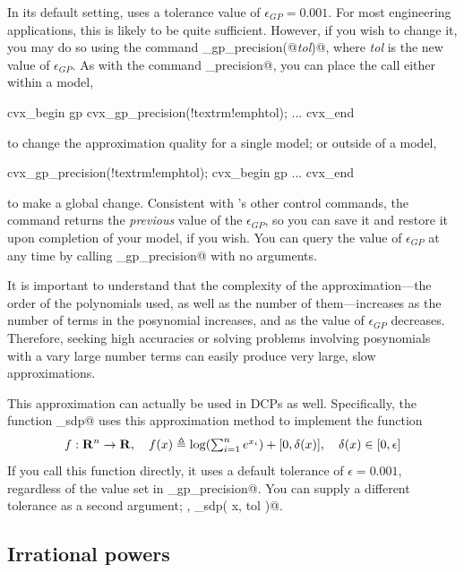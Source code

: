 \documentclass[12pt]{article}
\begin{document}
In its default setting, \cvx uses a tolerance value of $\epsilon_{GP}=0.001$.
For most engineering applications, this is likely to be quite sufficient. However,
if you wish to change it, you may do so using the command
\verb@cvx_gp_precision(@\emph{tol}\verb@)@,
where \emph{tol} is the new value of $\epsilon_{GP}$. As with the command
\verb@cvx_precision@, you can place the call either within a model,
\begin{code}[commandchars=\!\{\}]
	cvx_begin gp
	    cvx_gp_precision(!textrm{!emph{tol}});
	    ...
	cvx_end
\end{code}
to change the approximation quality for a single model; or outside of a model,
\begin{code}[commandchars=\!\{\}]
	cvx_gp_precision(!textrm{!emph{tol}});
	cvx_begin gp
	    ...
	cvx_end
\end{code}
to make a global change. Consistent with
\cvx's other control commands, the command returns the \emph{previous}
value of the $\epsilon_{GP}$, so you can save it and restore it upon completion
of your model, if you wish. You can query the value of $\epsilon_{GP}$ at any
time by calling \verb@cvx_gp_precision@ with no arguments. 

It is important to understand that the complexity of the approximation---the order of
the polynomials used, as well as the number of them---increases as the
number of terms in the posynomial increases, and as the value of $\epsilon_{GP}$
decreases. Therefore, seeking high accuracies or solving problems involving 
posynomials with a vary large number terms can easily produce very large, slow
approximations.

This approximation can actually be used in DCPs as well.
Specifically, the function \verb@logsumexp_sdp@ uses this approximation
method to implement the function
\begin{equation}
	f:\Rn\rightarrow\R, \quad f(x) \eqbydef \log(\TS\sum_{i=1}^n e^{x_i}) + [0,\delta(x)], \quad \delta(x)\in[0,\epsilon]
\end{equation}
If you call this function directly, it uses a default tolerance of $\epsilon=0.001$, regardless
of the value set in \verb@cvx_gp_precision@. You can supply a different tolerance as a second
argument; \ie, \verb@logsumexp_sdp( x, tol )@.
\fi

\subsection{Irrational powers}
\label{sec:ratpow}
\end{document}
